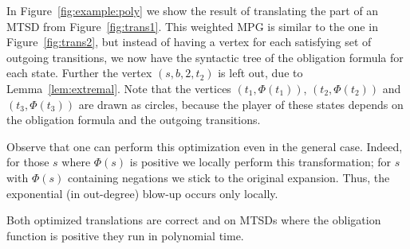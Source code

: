 \begin{example}
In Figure~\ref{fig:example:poly} we show the result of translating the part of an MTSD from Figure~\ref{fig:trans1}. This weighted MPG is similar to the one in Figure~\ref{fig:trans2}, but instead of having a vertex for each satisfying set of outgoing transitions, we now have the syntactic tree of the obligation formula for each state. Further the vertex $(s,b,2,t_2)$ is left out, due to Lemma~\ref{lem:extremal}. Note that the vertices $(t_1,\Phi(t_1))$, $(t_2,\Phi(t_2))$ and $(t_3,\Phi(t_3))$ are drawn as circles, because the player of these states depends on the obligation formula and the outgoing transitions. 
\end{example}


\begin{remark}
 Observe that one can perform this optimization even in the general case. Indeed, for those $s$ where $\Phi(s)$ is positive we locally perform this transformation; for $s$ with $\Phi(s)$ containing negations we stick to the original expansion. Thus, the exponential (in out-degree) blow-up occurs only locally.
\end{remark}

\begin{lemma}\label{lem:opt2correct}
Both optimized translations are correct and on MTSDs where the obligation
function is positive they run in polynomial time.
\end{lemma}

